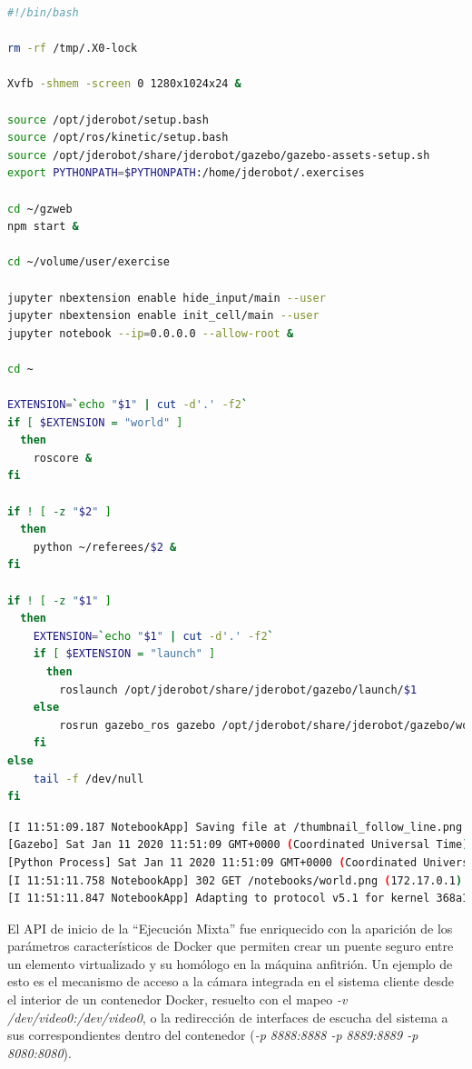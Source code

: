 \begin{lstlisting}[language=bash, caption=Código de Inicio del Secuenciador]
#!/bin/bash

rm -rf /tmp/.X0-lock

Xvfb -shmem -screen 0 1280x1024x24 &

source /opt/jderobot/setup.bash
source /opt/ros/kinetic/setup.bash
source /opt/jderobot/share/jderobot/gazebo/gazebo-assets-setup.sh
export PYTHONPATH=$PYTHONPATH:/home/jderobot/.exercises

cd ~/gzweb
npm start &

cd ~/volume/user/exercise

jupyter nbextension enable hide_input/main --user
jupyter nbextension enable init_cell/main --user
jupyter notebook --ip=0.0.0.0 --allow-root &

cd ~

EXTENSION=`echo "$1" | cut -d'.' -f2`
if [ $EXTENSION = "world" ]
  then
    roscore &
fi

if ! [ -z "$2" ]
  then
    python ~/referees/$2 &
fi

if ! [ -z "$1" ]
  then
    EXTENSION=`echo "$1" | cut -d'.' -f2`
    if [ $EXTENSION = "launch" ]
      then
        roslaunch /opt/jderobot/share/jderobot/gazebo/launch/$1
    else
        rosrun gazebo_ros gazebo /opt/jderobot/share/jderobot/gazebo/worlds/$1
    fi
else
    tail -f /dev/null
fi
\end{lstlisting}
\begin{lstlisting}[language=bash, caption=Reenvío de Mensajes]
[I 11:51:09.187 NotebookApp] Saving file at /thumbnail_follow_line.png
[Gazebo] Sat Jan 11 2020 11:51:09 GMT+0000 (Coordinated Universal Time) Received Message: {"op":"advertise","id":"advertise:~/heartbeat:14","type":"heartbeat","topic":"~/heartbeat"} from http://127.0.0.1:8080 ::ffff:172.17.0.1
[Python Process] Sat Jan 11 2020 11:51:09 GMT+0000 (Coordinated Universal Time) Received Message: {"op":"publish","id":"publish:~/heartbeat:15","topic":"~/heartbeat","msg":{"alive":1}} from http://127.0.0.1:8080 ::ffff:172.17.0.1
[I 11:51:11.758 NotebookApp] 302 GET /notebooks/world.png (172.17.0.1) 0.95ms
[I 11:51:11.847 NotebookApp] Adapting to protocol v5.1 for kernel 368a1e46-acc2-4976-acf3-25528ae77d77
\end{lstlisting}

El API de inicio de la ``Ejecución Mixta'' fue enriquecido con la aparición de los parámetros característicos de Docker que permiten crear un puente seguro entre un elemento virtualizado y su homólogo en la máquina anfitrión. Un ejemplo de esto es el mecanismo de acceso a la cámara integrada en el sistema cliente desde el interior de un contenedor Docker, resuelto con el mapeo \textit{-v /dev/video0:/dev/video0}, o la redirección de interfaces de escucha del sistema a sus correspondientes dentro del contenedor (\textit{-p 8888:8888 -p 8889:8889 -p 8080:8080}).

